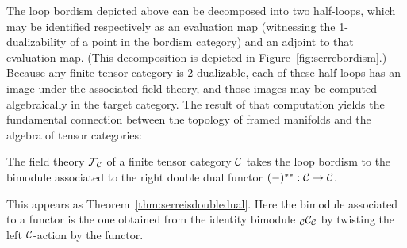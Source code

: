 \documentclass{amsart}
\begin{document}
The loop bordism depicted above can be decomposed into two half-loops, which may be identified respectively as an evaluation map (witnessing the 1-dualizability of a point in the bordism category) and an adjoint to that evaluation map.  (This decomposition is depicted in Figure~\ref{fig:serrebordism}.)  Because any finite tensor category is 2-dualizable, each of these half-loops has an image under the associated field theory, and those images may be computed algebraically in the target category.  The result of that computation yields the fundamental connection between the topology of framed manifolds and the algebra of tensor categories:
\begin{maintheorem} \label{thm6}
The field theory $\mathcal F_\mathcal C$ of a finite tensor category $\mathcal C$ takes the loop bordism to the bimodule associated to the right double dual functor $(-)^{**}: \mathcal C \rightarrow \mathcal C$.
\end{maintheorem}
\nid This appears as Theorem~\ref{thm:serreisdoubledual}.  Here the bimodule associated to a functor is the one obtained from the identity bimodule ${}_\mathcal C \mathcal C_\mathcal C$ by twisting the left $\mathcal C$-action by the functor.
\end{document}
